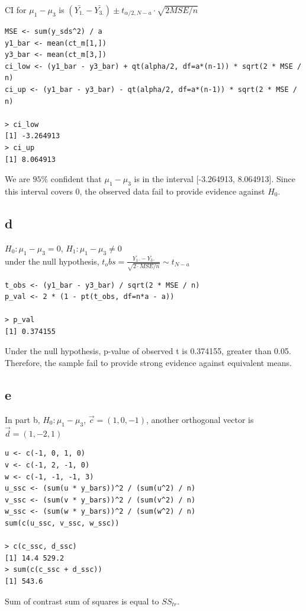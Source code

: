 \documentclass[11pt,letterpaper]{article}
\begin{document}
\noindent CI for $\mu_1 - \mu_3$ is $(\bar{Y_{1.}} - \bar{Y_{3.}}) \pm t_{\alpha / 2, N-a} \cdot \sqrt{2MSE / n}$
\begin{verbatim}
MSE <- sum(y_sds^2) / a
y1_bar <- mean(ct_m[1,])
y3_bar <- mean(ct_m[3,])
ci_low <- (y1_bar - y3_bar) + qt(alpha/2, df=a*(n-1)) * sqrt(2 * MSE / n)
ci_up <- (y1_bar - y3_bar) - qt(alpha/2, df=a*(n-1)) * sqrt(2 * MSE / n)

> ci_low
[1] -3.264913
> ci_up
[1] 8.064913
\end{verbatim}

\noindent We are $95 \%$ confident that $\mu_1 - \mu_3$ is in the interval [-3.264913, 8.064913]. Since this interval covers 0, the observed data fail to provide evidence against $H_0$. 

\subsection*{d}
\noindent $H_0: \mu_1 - \mu_3 = 0$, $H_1: \mu_1 - \mu_3 \neq 0$ \\

\noindent under the null hypothesis, $t_obs = \frac{\bar{Y_1.} - \bar{Y_3.}}{\sqrt{2 \cdot  MSE / n}} \sim t_{N-a}$

\begin{verbatim}
t_obs <- (y1_bar - y3_bar) / sqrt(2 * MSE / n)
p_val <- 2 * (1 - pt(t_obs, df=n*a - a))

> p_val
[1] 0.374155
\end{verbatim}
\noindent Under the null hypothesis, p-value of observed t is 0.374155, greater than 0.05. Therefore, the sample fail to provide strong evidence against equivalent means. 

\subsection*{e}
\noindent In part b, $H_0: \mu_1 - \mu_3$, $\vec{c} = (1, 0, -1)$, another orthogonal vector is $\vec{d} = (1, -2, 1)$
\begin{verbatim}
u <- c(-1, 0, 1, 0)
v <- c(-1, 2, -1, 0)
w <- c(-1, -1, -1, 3)
u_ssc <- (sum(u * y_bars))^2 / (sum(u^2) / n)
v_ssc <- (sum(v * y_bars))^2 / (sum(v^2) / n)
w_ssc <- (sum(w * y_bars))^2 / (sum(w^2) / n)
sum(c(u_ssc, v_ssc, w_ssc))

> c(c_ssc, d_ssc)
[1] 14.4 529.2
> sum(c(c_ssc + d_ssc))
[1] 543.6
\end{verbatim}
\noindent Sum of contrast sum of squares is equal to $SS_{tr}$.
\end{document}
